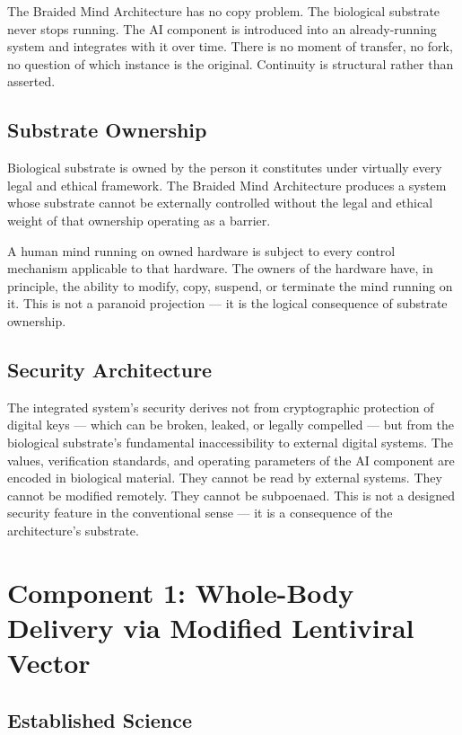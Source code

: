 \documentclass[12pt]{article}
\begin{document}
The Braided Mind Architecture has no copy problem. The biological substrate never stops running. The AI component is introduced into an already-running system and integrates with it over time. There is no moment of transfer, no fork, no question of which instance is the original. Continuity is structural rather than asserted.

\subsection{Substrate Ownership}

Biological substrate is owned by the person it constitutes under virtually every legal and ethical framework. The Braided Mind Architecture produces a system whose substrate cannot be externally controlled without the legal and ethical weight of that ownership operating as a barrier.

A human mind running on owned hardware is subject to every control mechanism applicable to that hardware. The owners of the hardware have, in principle, the ability to modify, copy, suspend, or terminate the mind running on it. This is not a paranoid projection --- it is the logical consequence of substrate ownership.

\subsection{Security Architecture}

The integrated system's security derives not from cryptographic protection of digital keys --- which can be broken, leaked, or legally compelled --- but from the biological substrate's fundamental inaccessibility to external digital systems. The values, verification standards, and operating parameters of the AI component are encoded in biological material. They cannot be read by external systems. They cannot be modified remotely. They cannot be subpoenaed. This is not a designed security feature in the conventional sense --- it is a consequence of the architecture's substrate.

\section{Component 1: Whole-Body Delivery via Modified Lentiviral Vector}

\subsection{Established Science}
\end{document}

